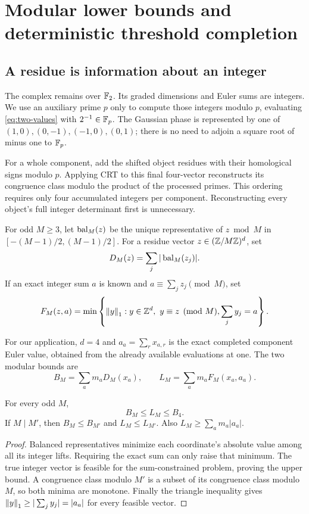 \section{Modular lower bounds and deterministic threshold completion}
\label{sec:modular}

\subsection{A residue is information about an integer}

The complex remains over $\mathbb F_2$. Its graded dimensions and Euler sums are
integers. We use an auxiliary prime $p$ only to compute those integers modulo
$p$, evaluating \cref{eq:two-values} with $2^{-1}\in\mathbb F_p$. The Gaussian phase
is represented by one of $(1,0),(0,-1),(-1,0),(0,1)$; there is no need to adjoin
a square root of minus one to $\mathbb F_p$.

For a whole component, add the shifted object residues with their homological
signs modulo $p$. Applying CRT to this final four-vector reconstructs its
congruence class modulo the product of the processed primes. This ordering
requires only four accumulated integers per component. Reconstructing every
object's full integer determinant first is unnecessary.

\begin{samepage}
\begin{definition}
For odd $M\ge3$, let $\operatorname{bal}_M(z)$ be the unique representative of $z\bmod M$
in $[-(M-1)/2,(M-1)/2]$. For a residue vector $z\in(\mathbb Z/M\mathbb Z)^d$, set
\[
 D_M(z)=\sum_j|\operatorname{bal}_M(z_j)|.
\]
If an exact integer sum $a$ is known and $a\equiv\sum_jz_j\pmod M$, set
\[
 F_M(z,a)=\min\left\{\norm{y}:y\in\Z^d,\ y\equiv z\pmod M,
                                  \sum_j y_j=a\right\}.
\]
\end{definition}
\end{samepage}

For our application, $d=4$ and $a_a=\sum_r x_{a,r}$ is the exact completed
component Euler value, obtained from the already available evaluations at one.
The two modular bounds are
\begin{equation}
 B_M=\sum_a m_aD_M(x_a),\qquad
 L_M=\sum_a m_aF_M(x_a,a_a).
 \label{eq:modular-bounds}
\end{equation}

\begin{proposition}
\label{prop:monotone}
For every odd $M$,
\[
                 B_M\le L_M\le B_4.
\]
If $M\mid M'$, then $B_M\le B_{M'}$ and $L_M\le L_{M'}$.
Also $L_M\ge\sum_a m_a|a_a|$.
\end{proposition}
\begin{proof}
Balanced representatives minimize each coordinate's absolute value among all
its integer lifts. Requiring the exact sum can only raise that minimum. The
true integer vector is feasible for the sum-constrained problem, proving the
upper bound. A congruence class modulo $M'$ is a subset of its congruence
class modulo $M$, so both minima are monotone. Finally the triangle inequality
gives $\left\lVert y\right\rVert_1\ge|\sum_jy_j|=|a_a|$ for every feasible vector.
\end{proof}

